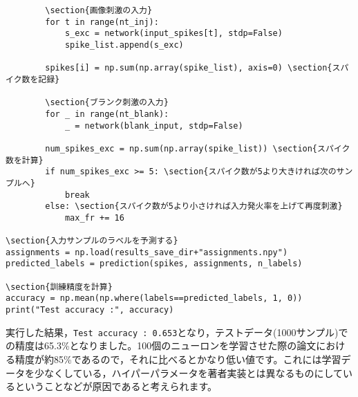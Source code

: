 \begin{verbatim}
        \section{画像刺激の入力}
        for t in range(nt_inj):
            s_exc = network(input_spikes[t], stdp=False)
            spike_list.append(s_exc)
        
        spikes[i] = np.sum(np.array(spike_list), axis=0) \section{スパイク数を記録}
        
        \section{ブランク刺激の入力}
        for _ in range(nt_blank):
            _ = network(blank_input, stdp=False)

        num_spikes_exc = np.sum(np.array(spike_list)) \section{スパイク数を計算}
        if num_spikes_exc >= 5: \section{スパイク数が5より大きければ次のサンプルへ}
            break
        else: \section{スパイク数が5より小さければ入力発火率を上げて再度刺激}
            max_fr += 16
            
\section{入力サンプルのラベルを予測する}
assignments = np.load(results_save_dir+"assignments.npy")
predicted_labels = prediction(spikes, assignments, n_labels)

\section{訓練精度を計算}
accuracy = np.mean(np.where(labels==predicted_labels, 1, 0))
print("Test accuracy :", accuracy)
\end{verbatim}
実行した結果，\colorbox{shadecolor}{\texttt{Test accuracy : 0.653}}となり，テストデータ(1000サンプル)での精度は65.3\%となりました。100個のニューロンを学習させた際の論文における精度が約85\%であるので，それに比べるとかなり低い値です。これには学習データを少なくしている，ハイパーパラメータを著者実装とは異なるものにしているということなどが原因であると考えられます。


